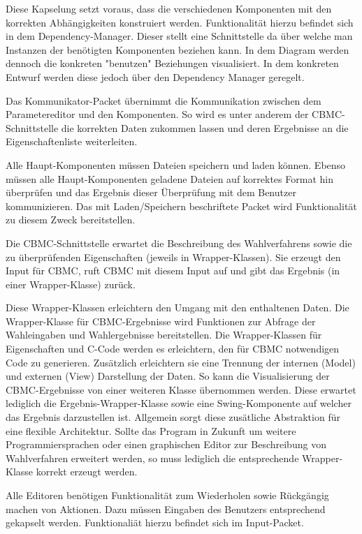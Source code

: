 \documentclass[a4paper]{scrreprt}
\begin{document}
Diese Kapselung setzt voraus, dass die verschiedenen Komponenten mit den korrekten Abhängigkeiten konstruiert werden. Funktionalität hierzu befindet sich in dem Dependency-Manager. Dieser stellt eine Schnittstelle da über welche man Instanzen der benötigten Komponenten beziehen kann. In dem Diagram werden dennoch die konkreten "benutzen" Beziehungen visualisiert. In dem konkreten Entwurf werden diese jedoch über den Dependency Manager geregelt. 

Das Kommunikator-Packet übernimmt die Kommunikation zwischen dem Parametereditor und den Komponenten. So wird es unter anderem der CBMC-Schnittstelle die korrekten Daten zukommen lassen und deren Ergebnisse an die Eigenschaftenliste weiterleiten.

Alle Haupt-Komponenten müssen Dateien speichern und laden können. Ebenso müssen alle Haupt-Komponenten geladene Dateien auf korrektes Format hin überprüfen und das Ergebnis dieser Überprüfung mit dem Benutzer kommunizieren. Das mit Laden/Speichern beschriftete Packet wird Funktionalität zu diesem Zweck bereitstellen. 

Die CBMC-Schnittstelle erwartet die Beschreibung des Wahlverfahrens sowie die zu überprüfenden Eigenschaften (jeweils in Wrapper-Klassen). Sie erzeugt den Input für CBMC, ruft CBMC mit diesem Input auf und gibt das Ergebnis (in einer Wrapper-Klasse) zurück.

Diese Wrapper-Klassen erleichtern den Umgang mit den enthaltenen Daten. Die Wrapper-Klasse für CBMC-Ergebnisse wird Funktionen zur Abfrage der Wahleingaben und Wahlergebnisse bereitstellen. Die Wrapper-Klassen für Eigenschaften und C-Code werden es erleichtern, den für CBMC notwendigen Code zu generieren. Zusätzlich erleichtern sie eine Trennung der internen (Model) und externen (View) Darstellung der Daten. So kann die Visualisierung der CBMC-Ergebnisse von einer weiteren Klasse übernommen werden. Diese erwartet lediglich die Ergebnis-Wrapper-Klasse sowie eine Swing-Komponente auf welcher das Ergebnis darzustellen ist. Allgemein sorgt diese zusätliche  Abstraktion für eine flexible Architektur. Sollte das Program in Zukunft um weitere Programmiersprachen oder einen graphischen Editor zur Beschreibung von Wahlverfahren erweitert werden, so muss lediglich die entsprechende Wrapper-Klasse korrekt erzeugt werden.

Alle Editoren benötigen Funktionalität zum Wiederholen sowie Rückgängig machen von Aktionen. Dazu müssen Eingaben des Benutzers entsprechend gekapselt werden. Funktionaliät hierzu befindet sich im Input-Packet.
\end{document}
